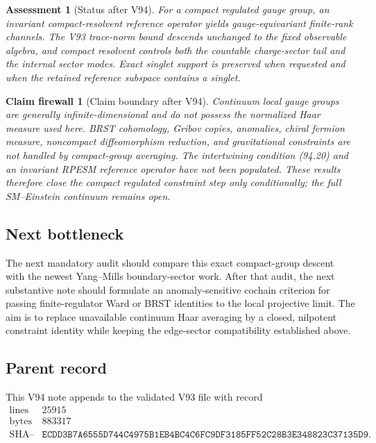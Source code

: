 \documentclass[11pt]{article}
\newtheorem{firewall}[theorem]{Claim firewall}
\newtheorem{assessment}[theorem]{Assessment}
\theoremstyle{remark}
\begin{document}
\begin{assessment}[Status after V94]
\label{ass:v12v94-status}
For a compact regulated gauge group, an invariant
compact-resolvent reference operator yields gauge-equivariant
finite-rank channels.  The V93 trace-norm bound descends unchanged
to the fixed observable algebra, and compact resolvent controls
both the countable charge-sector tail and the internal sector
modes.  Exact singlet support is preserved when requested and when
the retained reference subspace contains a singlet.
\end{assessment}

\begin{firewall}[Claim boundary after V94]
\label{fire:v12v94-claim}
Continuum local gauge groups are generally infinite-dimensional and
do not possess the normalized Haar measure used here.  BRST
cohomology, Gribov copies, anomalies, chiral fermion measure,
noncompact diffeomorphism reduction, and gravitational constraints
are not handled by compact-group averaging.  The intertwining
condition (94.20) and an invariant RPESM reference operator have not
been populated.  These results therefore close the compact
regulated constraint step only conditionally; the full
SM--Einstein continuum remains open.
\end{firewall}

\subsection{Next bottleneck}

The next mandatory audit should compare this exact compact-group
descent with the newest Yang--Mills boundary-sector work.  After
that audit, the next substantive note should formulate an
anomaly-sensitive cochain criterion for passing finite-regulator
Ward or BRST identities to the local projective limit.  The aim is
to replace unavailable continuum Haar averaging by a closed,
nilpotent constraint identity while keeping the edge-sector
compatibility established above.

\subsection{Parent record}

This V94 note appends to the validated V93 file with record
\[
\begin{array}{c|c}
\text{lines}&25915\\
\text{bytes}&883317\\
\text{SHA--256}&
\texttt{ECDD3B7A6555D744C4975B1EB4BC4C6FC9DF3185FF52C28B3E348823C37135D9}.
\end{array}
\]
\end{document}
